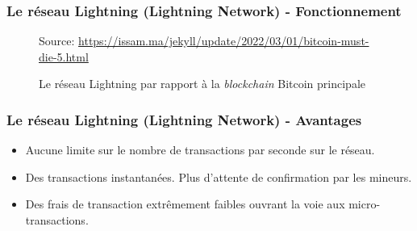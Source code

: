 \begin{frame}
	\frametitle{Le réseau Lightning (Lightning Network) - Fonctionnement }
	\begin{figure}[h!]
		{\scriptsize Source: \url{https://issam.ma/jekyll/update/2022/03/01/bitcoin-must-die-5.html}}

		\caption{Le réseau Lightning par rapport à la \textit{blockchain} Bitcoin principale}

	\end{figure}

\end{frame}

\begin{frame}
	\frametitle{Le réseau Lightning (Lightning Network) - Avantages}
	\begin{itemize}
		\item Aucune limite sur le nombre de transactions par seconde sur le réseau.
		      \newline
		\item Des transactions instantanées. Plus d’attente de confirmation par les mineurs.
		      \newline
		\item Des frais de transaction extrêmement faibles ouvrant la voie aux micro-transactions.
	\end{itemize}
\end{frame}

